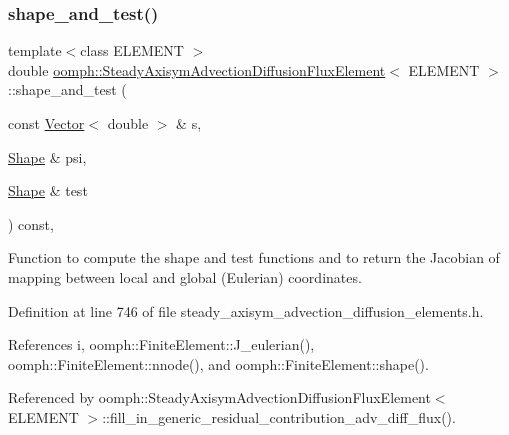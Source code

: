 \subsubsection{\texorpdfstring{shape\+\_\+and\+\_\+test()}{shape\_and\_test()}}
{\footnotesize\ttfamily template$<$class E\+L\+E\+M\+E\+NT $>$ \\
double \hyperlink{classoomph_1_1SteadyAxisymAdvectionDiffusionFluxElement}{oomph\+::\+Steady\+Axisym\+Advection\+Diffusion\+Flux\+Element}$<$ E\+L\+E\+M\+E\+NT $>$\+::shape\+\_\+and\+\_\+test (\begin{DoxyParamCaption}\item[{const \hyperlink{classoomph_1_1Vector}{Vector}$<$ double $>$ \&}]{s,  }\item[{\hyperlink{classoomph_1_1Shape}{Shape} \&}]{psi,  }\item[{\hyperlink{classoomph_1_1Shape}{Shape} \&}]{test }\end{DoxyParamCaption}) const\hspace{0.3cm}{\ttfamily [inline]}, {\ttfamily [protected]}}



Function to compute the shape and test functions and to return the Jacobian of mapping between local and global (Eulerian) coordinates. 



Definition at line 746 of file steady\+\_\+axisym\+\_\+advection\+\_\+diffusion\+\_\+elements.\+h.



References i, oomph\+::\+Finite\+Element\+::\+J\+\_\+eulerian(), oomph\+::\+Finite\+Element\+::nnode(), and oomph\+::\+Finite\+Element\+::shape().



Referenced by oomph\+::\+Steady\+Axisym\+Advection\+Diffusion\+Flux\+Element$<$ E\+L\+E\+M\+E\+N\+T $>$\+::fill\+\_\+in\+\_\+generic\+\_\+residual\+\_\+contribution\+\_\+adv\+\_\+diff\+\_\+flux().

\mbox{\label{classoomph_1_1SteadyAxisymAdvectionDiffusionFluxElement_a30496e1e50e14c11539ea7e80b2f7fad}} 
